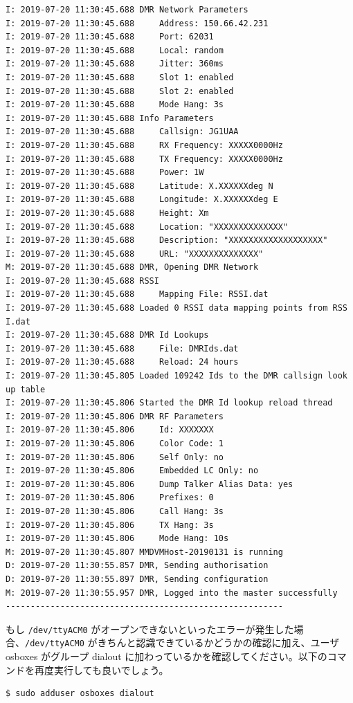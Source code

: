 \documentclass[a4j,oneside]{ujbook}
\begin{document}
\begin{verbatim}
I: 2019-07-20 11:30:45.688 DMR Network Parameters
I: 2019-07-20 11:30:45.688     Address: 150.66.42.231
I: 2019-07-20 11:30:45.688     Port: 62031
I: 2019-07-20 11:30:45.688     Local: random
I: 2019-07-20 11:30:45.688     Jitter: 360ms
I: 2019-07-20 11:30:45.688     Slot 1: enabled
I: 2019-07-20 11:30:45.688     Slot 2: enabled
I: 2019-07-20 11:30:45.688     Mode Hang: 3s
I: 2019-07-20 11:30:45.688 Info Parameters
I: 2019-07-20 11:30:45.688     Callsign: JG1UAA
I: 2019-07-20 11:30:45.688     RX Frequency: XXXXX0000Hz
I: 2019-07-20 11:30:45.688     TX Frequency: XXXXX0000Hz
I: 2019-07-20 11:30:45.688     Power: 1W
I: 2019-07-20 11:30:45.688     Latitude: X.XXXXXXdeg N
I: 2019-07-20 11:30:45.688     Longitude: X.XXXXXXdeg E
I: 2019-07-20 11:30:45.688     Height: Xm
I: 2019-07-20 11:30:45.688     Location: "XXXXXXXXXXXXXX"
I: 2019-07-20 11:30:45.688     Description: "XXXXXXXXXXXXXXXXXXX"
I: 2019-07-20 11:30:45.688     URL: "XXXXXXXXXXXXXX"
M: 2019-07-20 11:30:45.688 DMR, Opening DMR Network
I: 2019-07-20 11:30:45.688 RSSI
I: 2019-07-20 11:30:45.688     Mapping File: RSSI.dat
I: 2019-07-20 11:30:45.688 Loaded 0 RSSI data mapping points from RSS
I.dat
I: 2019-07-20 11:30:45.688 DMR Id Lookups
I: 2019-07-20 11:30:45.688     File: DMRIds.dat
I: 2019-07-20 11:30:45.688     Reload: 24 hours
I: 2019-07-20 11:30:45.805 Loaded 109242 Ids to the DMR callsign look
up table
I: 2019-07-20 11:30:45.806 Started the DMR Id lookup reload thread
I: 2019-07-20 11:30:45.806 DMR RF Parameters
I: 2019-07-20 11:30:45.806     Id: XXXXXXX
I: 2019-07-20 11:30:45.806     Color Code: 1
I: 2019-07-20 11:30:45.806     Self Only: no
I: 2019-07-20 11:30:45.806     Embedded LC Only: no
I: 2019-07-20 11:30:45.806     Dump Talker Alias Data: yes
I: 2019-07-20 11:30:45.806     Prefixes: 0
I: 2019-07-20 11:30:45.806     Call Hang: 3s
I: 2019-07-20 11:30:45.806     TX Hang: 3s
I: 2019-07-20 11:30:45.806     Mode Hang: 10s
M: 2019-07-20 11:30:45.807 MMDVMHost-20190131 is running
D: 2019-07-20 11:30:55.857 DMR, Sending authorisation
D: 2019-07-20 11:30:55.897 DMR, Sending configuration
M: 2019-07-20 11:30:55.957 DMR, Logged into the master successfully
--------------------------------------------------------
\end{verbatim}

もし \verb+/dev/ttyACM0+ がオープンできないといったエラーが発生した場合、\verb+/dev/ttyACM0+ がきちんと認識できているかどうかの確認に加え、ユーザ osboxes がグループ dialout に加わっているかを確認してください。以下のコマンドを再度実行しても良いでしょう。

\begin{verbatim}
$ sudo adduser osboxes dialout
\end{verbatim}
\end{document}
